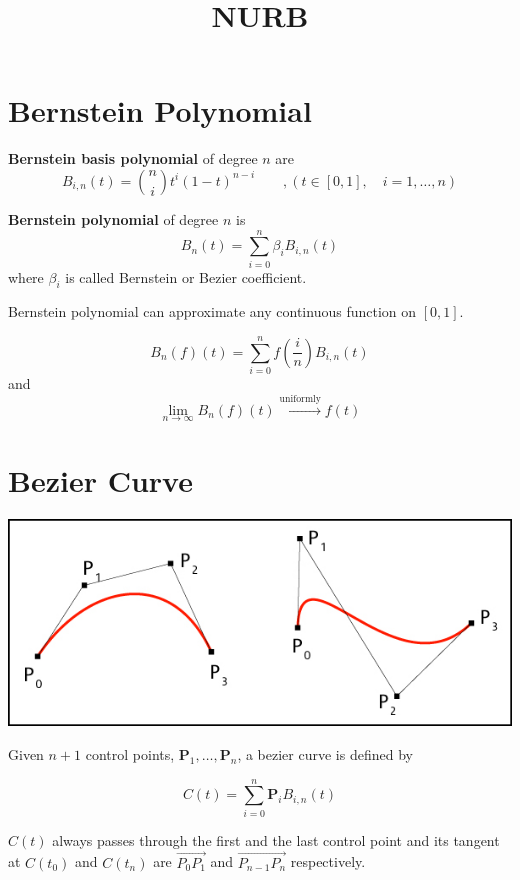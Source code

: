 \documentclass[UTF8]{ctexart}
\title{NURB}
\begin{document}
	\maketitle
\section{Bernstein Polynomial}

\textbf{Bernstein basis polynomial} of degree $n$ are 
$$ B_{i,n}(t) = \binom{n}{i} t^i (1 - t)^{n-i} \qquad ,(t \in \left[0, 1\right], \quad i = 1,\ldots,n)$$

\textbf{Bernstein polynomial} of degree $n$ is 
$$B_n(t) = \sum_{i=0}^{n} \beta_i B_{i, n}(t)$$
where $\beta_i$ is called Bernstein or Bezier coefficient.
	
Bernstein polynomial can approximate any continuous function on $\left[0, 1\right]$. 

$$ B_n(f)(t) = \sum_{i=0}^{n} f\left(\frac{i}{n}\right) B_{i, n}(t)$$
and  $$ \lim_{n\rightarrow \infty} B_n(f)(t) \xrightarrow{\text{uniformly}} f(t)$$


\section{Bezier Curve}

\begin{center}
	\includegraphics[scale=0.5]{bezier_01.jpg}
\end{center}

Given $n+1$ control points, $\boldsymbol{P}_1, \ldots, \boldsymbol{P}_n$,  a bezier curve is defined by 

$$ C(t) = \sum_{i=0}^{n} \boldsymbol{P}_i B_{i, n}(t)$$

$C(t)$ always passes through the first and the last control point and its tangent at $C(t_0)$ and $C(t_n)$ are $\overrightarrow{P_0P_1}$ and $\overrightarrow{P_{n-1}P_n}$ respectively.
\end{document}
